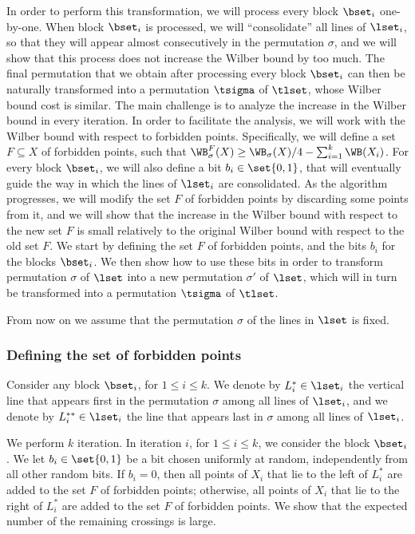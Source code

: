 In order to perform this transformation, we will process every block $\bset_i$ one-by-one. When block $\bset_i$ is processed, we will ``consolidate'' all lines of $\lset_i$, so that they will appear almost consecutively in the permutation $\sigma$, and we will show that this process does not increase the Wilber bound by too much. The final permutation that we obtain after processing every block $\bset_i$ can then be naturally transformed into a permutation $\tsigma$ of $\tlset$, whose Wilber bound cost is similar. The main challenge is to analyze the increase in the Wilber bound in every iteration. In order to facilitate the analysis, we will work with the Wilber bound with respect to forbidden points. Specifically, we will define a set $F\subseteq X$ of forbidden points, such that $\WB_{\sigma}^F(X)\geq \WB_{\sigma}(X)/4-\sum_{i=1}^k\WB(X_i)$. For every block $\bset_i$, we will also define a bit $b_i\in \set{0,1}$, that will eventually guide the way in which the lines of $\lset_i$ are consolidated. As the algorithm progresses, we will modify the set $F$ of forbidden points by discarding some points from it, and we will show that the increase in the Wilber bound with respect to the new set $F$ is small relatively to the original Wilber bound with respect to the old set $F$. We start by defining the set $F$ of forbidden points, and the bits $b_i$ for the blocks $\bset_i$. We then show how to use these bits in order to transform permutation $\sigma$ of $\lset$ into a new permutation $\sigma'$ of $\lset$, which will in turn be transformed into a permutation $\tsigma$ of $\tlset$.

From now on we assume that the permutation $\sigma$ of the lines in $\lset$ is fixed.

%
%
%
%
\subsubsection{Defining the set  of forbidden points}
%
%
%
%
Consider any block $\bset_i$, for $1\leq i\leq k$. We denote by $L^*_i\in \lset_i$ the vertical line that appears first in the permutation $\sigma$ among all lines of $\lset_i$, and we denote by $L^{**}_i\in \lset_i$ the line that appears last in $\sigma$ among all lines of $\lset_i$. 

We perform $k$ iteration. In iteration $i$, for $1\leq i\leq k$, we consider the block $\bset_i$. We let $b_i\in \set{0,1}$ be a bit chosen uniformly at random, independently from all other random bits. If $b_i=0$, then all points of $X_i$ that lie to the left of $L^*_i$ are added to the set $F$ of forbidden points; otherwise, all points of $X_i$ that lie to the right of $L^*_i$ are added to the set $F$ of forbidden points. We show that the expected number of the remaining crossings is large.


